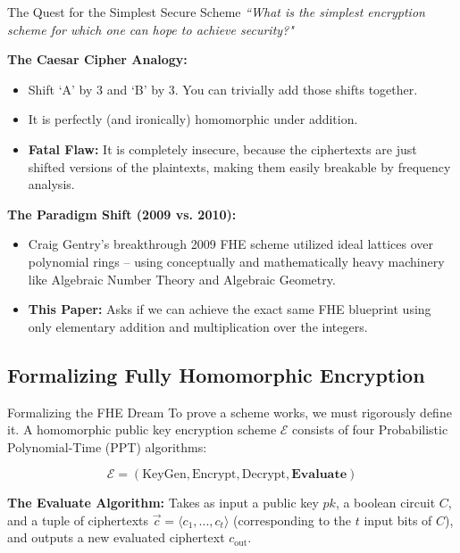 \documentclass[10pt,handout]{beamer}
\begin{document}
\begin{frame}{The Quest for the Simplest Secure Scheme}
    \textit{``What is the simplest encryption scheme for which one can hope to achieve security?"}
    \pause
    
    \vspace{0.3cm}
    \textbf{The Caesar Cipher Analogy:}
    \begin{itemize}
        \item Shift `A' by 3 and `B' by 3. You can trivially add those shifts together.
        \item It is perfectly (and ironically) homomorphic under addition. 
        \item \textbf{Fatal Flaw:} It is completely insecure, because the ciphertexts are just shifted versions of the plaintexts, making them easily breakable by frequency analysis.
    \end{itemize}
    \pause

    \vspace{0.3cm}
    \textbf{The Paradigm Shift (2009 vs. 2010):}
    \begin{itemize}
        \item Craig Gentry's breakthrough 2009 FHE scheme utilized ideal lattices over polynomial rings -- using conceptually and mathematically heavy machinery like Algebraic Number Theory and Algebraic Geometry.
        \pause
        \item \textbf{This Paper:} Asks if we can achieve the exact same FHE blueprint using only elementary addition and multiplication over the integers. 
    \end{itemize}
\end{frame}

\subsection{Formalizing Fully Homomorphic Encryption}

\begin{frame}{Formalizing the FHE Dream}
    To prove a scheme works, we must rigorously define it. A homomorphic public key encryption scheme $\mathcal{E}$ consists of four Probabilistic Polynomial-Time (PPT) algorithms:
    
    \pause
    $$\mathcal{E} = (\text{KeyGen}, \text{Encrypt}, \text{Decrypt}, \textbf{Evaluate})$$
    
    \vspace{0.3cm}
    \textbf{The Evaluate Algorithm:}
    Takes as input a public key $pk$, a boolean circuit $C$, and a tuple of ciphertexts $\vec{c}=\langle c_{1},...,c_{t}\rangle$ (corresponding to the $t$ input bits of $C$), and outputs a new evaluated ciphertext $c_{\text{out}}$.
\end{frame}
\end{document}
